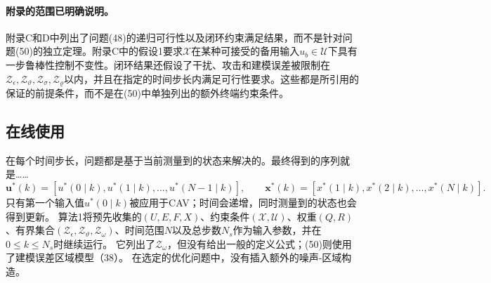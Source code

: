 \documentclass{article}
\begin{document}
\paragraph{附录的范围已明确说明。}
附录C和D中列出了问题(48)的递归可行性以及闭环约束满足结果，而不是针对问题(50)的独立定理。附录C中的假设1要求$\mathcal{X}$在某种可接受的备用输入$u_b\in\mathcal{U}$下具有一步鲁棒性控制不变性。闭环结果还假设了干扰、攻击和建模误差被限制在$\mathcal{Z}_{\epsilon},\mathcal{Z}_{\vartheta},\mathcal{Z}_{\sigma},\mathcal{Z}_{\varrho}$以内，并且在指定的时间步长内满足可行性要求。这些都是所引用的保证的前提条件，而不是在(50)中单独列出的额外终端约束条件。

\subsection*{在线使用}
在每个时间步长，问题都是基于当前测量到的状态来解决的。最终得到的序列就是……
\[
\mathbf{u}^*(k)=[u^*(0\mid k),u^*(1\mid k),\ldots,u^*(N-1\mid k)],\qquad
\mathbf{x}^*(k)=[x^*(1\mid k),x^*(2\mid k),\ldots,x^*(N\mid k)].
\]
只有第一个输入值$u^*(0\mid k)$被应用于CAV；时间会递增，同时测量到的状态也会得到更新。 算法1将预先收集的$(U,E,F,X)$、约束条件$(\mathcal{X},\mathcal{U})$、权重$(Q,R)$、有界集合$(\mathcal{Z}_{\epsilon},\mathcal{Z}_{\vartheta},\mathcal{Z}_{\omega})$、时间范围$N$以及总步数$N_s$作为输入参数，并在$0\leq k\leq N_s$时继续运行。 它列出了$\mathcal{Z}_{\omega}$，但没有给出一般的定义公式；(50)则使用了建模误差区域模型（38）。 在选定的优化问题中，没有插入额外的噪声-区域构造。
\end{document}
